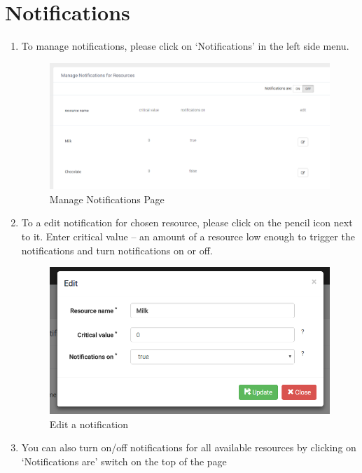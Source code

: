 \documentclass[a4paper,11pt,twoside]{report}
\theoremstyle{definition}
\begin{document}
\section{Notifications}
\begin{enumerate}

\item To manage notifications, please click on ‘Notifications’ in the left side menu. 


\begin{figure}[h!]
\begin{center}
\includegraphics[width=\textwidth]{AS/notifications/1}
\end{center}
\caption{Manage Notifications Page}
\end{figure}


\item To a edit notification for chosen resource, please click on the pencil icon next to it. Enter critical value – an amount of a resource low enough to trigger the notifications and turn notifications on or off.

\begin{figure}[h!]
\begin{center}
\includegraphics[width=\textwidth]{AS/notifications/2}
\end{center}
\caption{Edit a notification}
\end{figure}
\thispagestyle{empty}

\item You can also turn on/off notifications for all available resources by clicking on ‘Notifications are’ switch on the top of the page
\end{enumerate}
\end{document}
